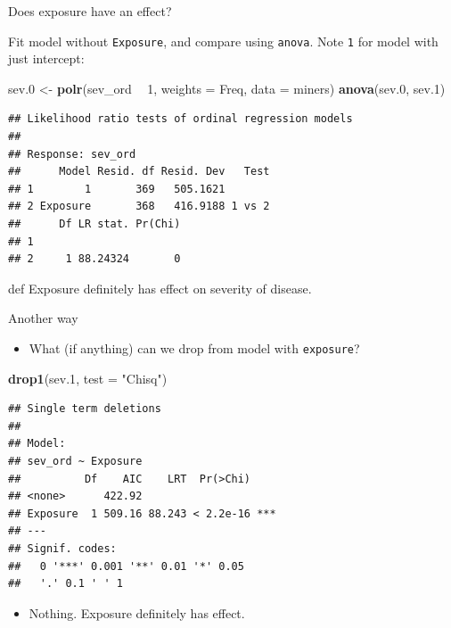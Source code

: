 \documentclass[ignorenonframetext,]{beamer}
\newenvironment{Shaded}{\begin{snugshade}}{\end{snugshade}}
\newcommand{\DataTypeTok}[1]{\textcolor[rgb]{0.13,0.29,0.53}{#1}}
\newcommand{\DecValTok}[1]{\textcolor[rgb]{0.00,0.00,0.81}{#1}}
\newcommand{\FloatTok}[1]{\textcolor[rgb]{0.00,0.00,0.81}{#1}}
\newcommand{\KeywordTok}[1]{\textcolor[rgb]{0.13,0.29,0.53}{\textbf{#1}}}
\newcommand{\NormalTok}[1]{#1}
\newcommand{\OperatorTok}[1]{\textcolor[rgb]{0.81,0.36,0.00}{\textbf{#1}}}
\newcommand{\StringTok}[1]{\textcolor[rgb]{0.31,0.60,0.02}{#1}}
\providecommand{\tightlist}{%
  \setlength{\itemsep}{0pt}\setlength{\parskip}{0pt}}
\begin{document}
\begin{frame}[fragile]{Does exposure have an effect?}
\protect\hypertarget{does-exposure-have-an-effect}{}

Fit model without \texttt{Exposure}, and compare using \texttt{anova}.
Note \texttt{1} for model with just intercept:

\begin{Shaded}
\begin{Highlighting}[]
\NormalTok{sev}\FloatTok{.0}\NormalTok{ <-}\StringTok{ }\KeywordTok{polr}\NormalTok{(sev_ord }\OperatorTok{~}\StringTok{ }\DecValTok{1}\NormalTok{, }\DataTypeTok{weights =}\NormalTok{ Freq, }\DataTypeTok{data =}\NormalTok{ miners)}
\KeywordTok{anova}\NormalTok{(sev}\FloatTok{.0}\NormalTok{, sev}\FloatTok{.1}\NormalTok{)}
\end{Highlighting}
\end{Shaded}

\begin{verbatim}
## Likelihood ratio tests of ordinal regression models
## 
## Response: sev_ord
##      Model Resid. df Resid. Dev   Test
## 1        1       369   505.1621       
## 2 Exposure       368   416.9188 1 vs 2
##      Df LR stat. Pr(Chi)
## 1                       
## 2     1 88.24324       0
\end{verbatim}

def Exposure definitely has effect on severity of disease.

\end{frame}

\begin{frame}[fragile]{Another way}
\protect\hypertarget{another-way}{}

\begin{itemize}
\tightlist
\item
  What (if anything) can we drop from model with \texttt{exposure}?
\end{itemize}

\begin{Shaded}
\begin{Highlighting}[]
\KeywordTok{drop1}\NormalTok{(sev}\FloatTok{.1}\NormalTok{, }\DataTypeTok{test =} \StringTok{"Chisq"}\NormalTok{)}
\end{Highlighting}
\end{Shaded}

\begin{verbatim}
## Single term deletions
## 
## Model:
## sev_ord ~ Exposure
##          Df    AIC    LRT  Pr(>Chi)    
## <none>      422.92                     
## Exposure  1 509.16 88.243 < 2.2e-16 ***
## ---
## Signif. codes:  
##   0 '***' 0.001 '**' 0.01 '*' 0.05
##   '.' 0.1 ' ' 1
\end{verbatim}

\begin{itemize}
\tightlist
\item
  Nothing. Exposure definitely has effect.
\end{itemize}

\end{frame}
\end{document}
